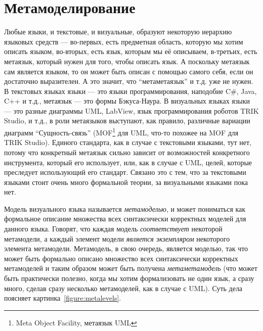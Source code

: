 \documentclass[a5paper]{article}
\begin{document}
\section{Метамоделирование}

Любые языки, и текстовые, и визуальные, образуют некоторую иерархию языковых средств --- во-первых, есть предметная область, которую мы хотим описать языком, во-вторых, есть язык, которым мы её описываем, в-третьих, есть метаязык, который нужен для того, чтобы описать язык. А поскольку метаязык сам является языком, то он может быть описан с помощью самого себя, если он достаточно выразителен. А это значит, что ``метаметаязык'' и т.д. уже не нужен. В текстовых языках языки --- это языки программирования, наподобие C\#, Java, C++ и т.д., метаязык --- это формы Бэкуса-Наура. В визуальных языках языки --- это разные диаграммы UML, LabView, язык программирования роботов TRIK Studio, и т.д., в роли метаязыков выступают, как правило, различные вариации диаграмм ``Сущность-связь'' (MOF\footnote{Meta Object Facility, метаязык UML} для UML, что-то похожее на MOF для TRIK Studio). Единого стандарта, как в случае с текстовыми языками, тут нет, потому что конкретный метаязык сильно зависит от возможностей конкретного инструмента, который его использует, или, как в случае с UML, целей, которые преследует использующий его стандарт. Связано это с тем, что за текстовыми языками стоит очень много формальной теории, за визуальными языками пока нет.

Модель визуального языка называется \textit{метамоделью}, и может пониматься как формальное описание множества всех синтаксически корректных моделей для данного языка. Говорят, что каждая модель \textit{соответствует} некоторой метамодели, а каждый элемент модели \textit{является экземпляром} некоторого элемента метамодели. Метамодель, в свою очередь, является моделью, так что может быть формально описано множество всех синтаксически корректных метамоделей и таким образом может быть получена \textit{метаметамодель} (что может быть практически полезно, когда мы хотим формализовать не один язык, а сразу много, сделав сразу несколько метамоделей, как в случае с UML). Суть дела поясняет картинка~\ref{figure:metalevels}.
\end{document}
